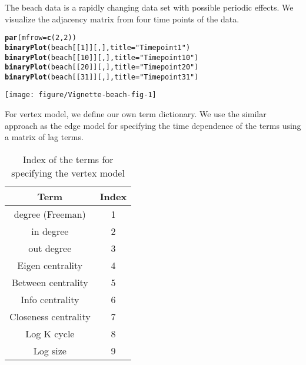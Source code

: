 \documentclass[12pt]{article}\usepackage[]{graphicx}\usepackage[]{color}
\makeatletter
\newcommand{\hlnum}[1]{\textcolor[rgb]{0.686,0.059,0.569}{#1}}%
\newcommand{\hlstr}[1]{\textcolor[rgb]{0.192,0.494,0.8}{#1}}%
\newcommand{\hlstd}[1]{\textcolor[rgb]{0.345,0.345,0.345}{#1}}%
\newcommand{\hlkwc}[1]{\textcolor[rgb]{0.333,0.667,0.333}{#1}}%
\newcommand{\hlkwd}[1]{\textcolor[rgb]{0.737,0.353,0.396}{\textbf{#1}}}%
\newenvironment{kframe}{%
 \def\at@end@of@kframe{}%
 \ifinner\ifhmode%
  \def\at@end@of@kframe{\end{minipage}}%
  \begin{minipage}{\columnwidth}%
 \fi\fi%
 \def\FrameCommand##1{\hskip\@totalleftmargin \hskip-\fboxsep
 \colorbox{shadecolor}{##1}\hskip-\fboxsep
     \hskip-\linewidth \hskip-\@totalleftmargin \hskip\columnwidth}%
 \MakeFramed {\advance\hsize-\width
   \@totalleftmargin\z@ \linewidth\hsize
   \@setminipage}}%
 {\par\unskip\endMakeFramed%
 \at@end@of@kframe}
\newenvironment{knitrout}{}{} %
\makeatother
\begin{document}
The beach data is a rapidly changing data set with possible periodic effects. We visualize the adjacency matrix from four time points of the data.

\begin{knitrout}
\color{fgcolor}\begin{kframe}
\begin{alltt}
\hlkwd{par}\hlstd{(}\hlkwc{mfrow} \hlstd{=} \hlkwd{c}\hlstd{(}\hlnum{2}\hlstd{,}\hlnum{2}\hlstd{))}
\hlkwd{binaryPlot}\hlstd{(beach[[}\hlnum{1}\hlstd{]][, ],} \hlkwc{title} \hlstd{=} \hlstr{"Time point 1"}\hlstd{)}
\hlkwd{binaryPlot}\hlstd{(beach[[}\hlnum{10}\hlstd{]][, ],} \hlkwc{title} \hlstd{=} \hlstr{"Time point 10"}\hlstd{)}
\hlkwd{binaryPlot}\hlstd{(beach[[}\hlnum{20}\hlstd{]][, ],} \hlkwc{title} \hlstd{=} \hlstr{"Time point 20"}\hlstd{)}
\hlkwd{binaryPlot}\hlstd{(beach[[}\hlnum{31}\hlstd{]][, ],} \hlkwc{title} \hlstd{=} \hlstr{"Time point 31"}\hlstd{)}
\end{alltt}
\end{kframe}

{\centering \texttt{[image: figure/Vignette-beach-fig-1]} 

}



\end{knitrout}

For vertex model, we define our own term dictionary. We use the similar approach as the edge model for specifying the time dependence of the terms using a matrix of lag terms.

\begin{table}[h]
  \centering
  \begin{tabular}[h]{|c|c|}
    \hline
    Term & Index \\
    \hline
    degree (Freeman) & 1 \\
    in degree & 2 \\
    out degree & 3 \\
    Eigen centrality & 4 \\
    Between centrality & 5 \\
    Info centrality & 6 \\
    Closeness centrality & 7 \\
    Log K cycle & 8 \\
    Log size & 9 \\
    \hline
  \end{tabular}
  \caption{Index of the terms for specifying the vertex model}
\end{table}
\end{document}

